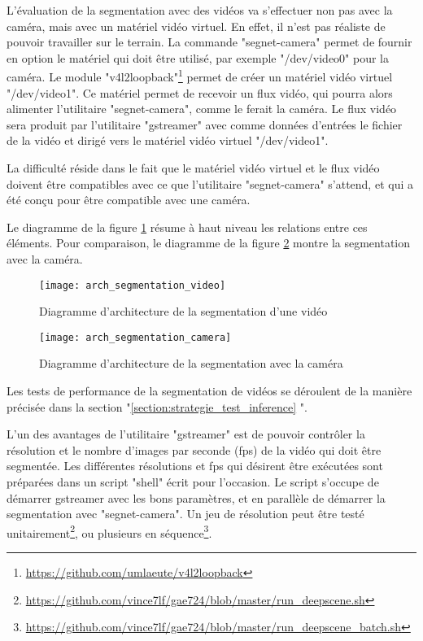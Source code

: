﻿
\par L'évaluation de la segmentation avec des vidéos va s'effectuer non pas avec la caméra, mais avec un matériel vidéo virtuel. En effet, il n'est pas réaliste de pouvoir travailler sur le terrain. La commande "segnet-camera" permet de fournir en option le matériel qui doit être utilisé, par exemple "/dev/video0" pour la caméra. Le module "v4l2loopback"\footnote{\url{https://github.com/umlaeute/v4l2loopback}} permet de créer un matériel vidéo virtuel "/dev/video1". Ce matériel permet de recevoir un flux vidéo, qui pourra alors alimenter l'utilitaire "segnet-camera", comme le ferait la caméra. Le flux vidéo sera produit par l'utilitaire "gstreamer" avec comme données d'entrées le fichier de la vidéo et dirigé vers le matériel vidéo virtuel "/dev/video1".
\par La difficulté réside dans le fait que le matériel vidéo virtuel et le flux vidéo doivent être compatibles avec ce que l'utilitaire "segnet-camera" s'attend, et qui a été conçu pour être compatible avec une caméra. 
\par Le diagramme de la figure \ref{fig:arch_segmentation_video} résume à haut niveau les relations entre ces éléments. Pour comparaison, le diagramme de la figure \ref{fig:arch_segmentation_camera} montre la segmentation avec la caméra. 
\begin{figure}[H]
    \centering
    \texttt{[image: arch\_segmentation\_video]}
    \caption[Diagramme d'architecture de la segmentation d'une vidéo]{Diagramme d'architecture de la segmentation d'une vidéo}
    \label{fig:arch_segmentation_video}
\end{figure}
\begin{figure}[H]
    \centering
    \texttt{[image: arch\_segmentation\_camera]}
    \caption[Diagramme d'architecture de la segmentation avec la caméra]{Diagramme d'architecture de la segmentation avec la caméra}
    \label{fig:arch_segmentation_camera}
\end{figure}
\par Les tests de performance de la segmentation de vidéos se déroulent de la manière précisée dans la section "\ref{section:strategie_test_inference} ". 
\par L'un des avantages de l'utilitaire "gstreamer" est de pouvoir contrôler la résolution et le nombre d'images par seconde (\acrshort{fps}) de la vidéo qui doit être segmentée. Les différentes résolutions et \acrshort{fps} qui désirent être exécutées sont préparées dans un script "shell" écrit pour l'occasion. Le script s'occupe de démarrer gstreamer avec les bons paramètres, et en parallèle de démarrer la segmentation avec "segnet-camera". Un jeu de résolution peut être testé unitairement\footnote{\url{https://github.com/vince7lf/gae724/blob/master/run_deepscene.sh}}, ou plusieurs en séquence\footnote{\url{https://github.com/vince7lf/gae724/blob/master/run_deepscene_batch.sh}}. 
